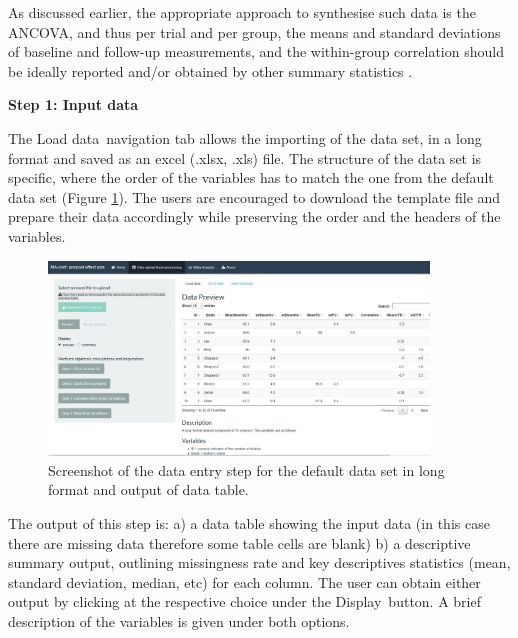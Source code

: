 \documentclass[AMA,STIX1COL]{WileyNJD-v2}
\begin{document}
As discussed earlier, the appropriate approach to synthesise such data is the ANCOVA, and thus per trial and per group, the means and standard deviations of baseline and follow-up measurements, and the within-group correlation should be ideally reported and/or obtained by other summary statistics \citep{higgins2011chapter}.
\vspace{0.1cm}

\textbf{Step 1: Input data}
\vspace{0.1cm}

The \textquotesingle Load data\textquotesingle\ navigation tab allows the importing of the data set, in a long format and saved as an excel (.xlsx, .xls) file. The structure of the data set is specific, where the order of the variables has to match the one from the default data set (Figure \ref{fig: shiny-input_data}). The users are encouraged to download the template file and prepare their data accordingly while preserving the order and the headers of the variables. 

\begin{figure}[t]
  \centering \includegraphics[width=0.9\textwidth]{input_data.JPG}
    \caption{\small {Screenshot of the data entry step for the default data set in long format and output of data table.}} \label{fig: shiny-input_data}
\end{figure}


The output of this step is: 
a) a data table showing the input data (in this case there are missing data therefore some table cells are blank)
b) a descriptive summary output, outlining missingness rate and key descriptives statistics (mean, standard deviation, median, etc) for each column. The user can obtain either output by clicking at the respective choice under the \textquotesingle Display\textquotesingle\ button. A brief description of the variables is given under both options.
\end{document}
